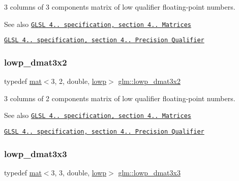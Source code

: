 3 columns of 3 components matrix of low qualifier floating-\/point numbers.

\begin{DoxySeeAlso}{See also}
\href{http://www.opengl.org/registry/doc/GLSLangSpec.4.20.8.pdf}{\tt G\+L\+SL 4.. specification, section 4.. Matrices} 

\href{http://www.opengl.org/registry/doc/GLSLangSpec.4.20.8.pdf}{\tt G\+L\+SL 4.. specification, section 4.. Precision Qualifier} 
\end{DoxySeeAlso}
\mbox{\label{group__core__precision_gae774d40dc418c39f5ef4dcf4deac0e3c}} 
\subsubsection{\texorpdfstring{lowp\+\_\+dmat3x2}{lowp\_dmat3x2}}
{\footnotesize\ttfamily typedef \mbox{\hyperlink{structglm_1_1mat}{mat}}$<$3, 2, double, \mbox{\hyperlink{namespaceglm_a36ed105b07c7746804d7fdc7cc90ff25ae161af3fc695e696ce3bf69f7332bc2d}{lowp}}$>$ \mbox{\hyperlink{group__core__precision_gae774d40dc418c39f5ef4dcf4deac0e3c}{glm\+::lowp\+\_\+dmat3x2}}}

3 columns of 2 components matrix of low qualifier floating-\/point numbers.

\begin{DoxySeeAlso}{See also}
\href{http://www.opengl.org/registry/doc/GLSLangSpec.4.20.8.pdf}{\tt G\+L\+SL 4.. specification, section 4.. Matrices} 

\href{http://www.opengl.org/registry/doc/GLSLangSpec.4.20.8.pdf}{\tt G\+L\+SL 4.. specification, section 4.. Precision Qualifier} 
\end{DoxySeeAlso}
\mbox{\label{group__core__precision_gacc5689588709eb4ccf582f21cd9af38c}} 
\subsubsection{\texorpdfstring{lowp\+\_\+dmat3x3}{lowp\_dmat3x3}}
{\footnotesize\ttfamily typedef \mbox{\hyperlink{structglm_1_1mat}{mat}}$<$3, 3, double, \mbox{\hyperlink{namespaceglm_a36ed105b07c7746804d7fdc7cc90ff25ae161af3fc695e696ce3bf69f7332bc2d}{lowp}}$>$ \mbox{\hyperlink{group__core__precision_gacc5689588709eb4ccf582f21cd9af38c}{glm\+::lowp\+\_\+dmat3x3}}}

